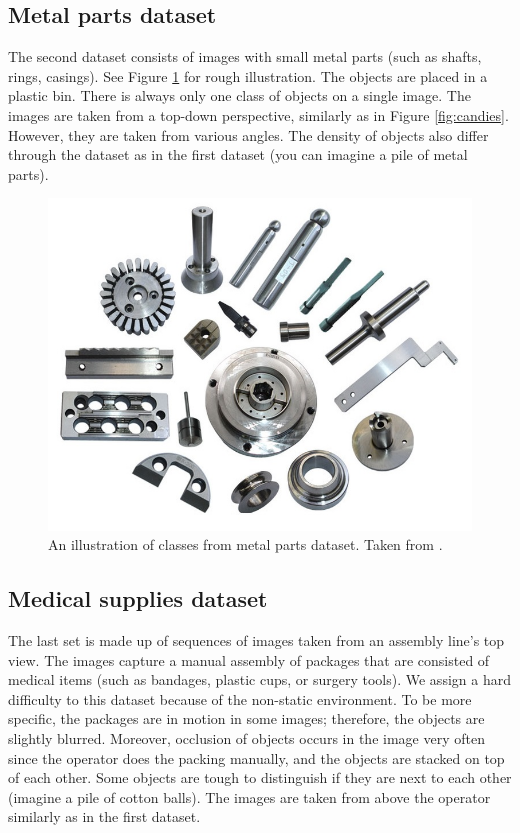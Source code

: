 \subsection*{Metal parts dataset}
The second dataset consists of images with small
metal parts (such as shafts, rings, casings). See Figure \ref{fig:parts} for
rough illustration. The objects are placed in a plastic bin. There is always
only one class of objects on a single image. The images are taken from a
top-down perspective, similarly as in Figure \ref{fig:candies}. However, they
are taken from various angles. The density of objects also differ through the
dataset as in the first dataset (you can imagine a pile of metal parts).

\begin{figure}[ht]
	\centering
	\includegraphics[height=0.35\linewidth]{Sources/Figures/metal_parts.jpg}
	\caption{An illustration of classes from metal parts dataset. Taken from
		\cite{parts}.}
	\label{fig:parts}
\end{figure}

\subsection*{Medical supplies dataset}
The last set is made up of sequences of images
taken from an assembly line's top view. The images capture a manual assembly of
packages that are consisted of medical items (such as bandages, plastic cups, or
surgery tools). We assign a hard difficulty to this dataset because of the
non-static environment. To be more specific, the packages are in motion in some
images; therefore, the objects are slightly blurred. Moreover, occlusion of
objects occurs in the image very often since the operator does the packing
manually, and the objects are stacked on top of each other. Some objects are
tough to distinguish if they are next to each other (imagine a pile of cotton
balls). The images are taken from above the operator similarly as in the first
dataset.

